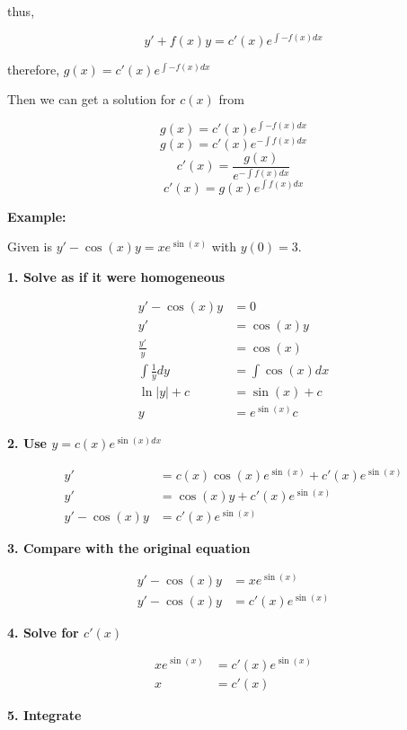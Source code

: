 thus,

\[
    y' + f(x)y = c'(x)e^{\int -f(x) dx}
\]

therefore, \(g(x) = c'(x)e^{\int -f(x) dx}\)

Then we can get a solution for \(c(x)\) from

\[
    g(x) = c'(x)e^{\int -f(x) dx}
\]
\[
    g(x) = c'(x)e^{-\int f(x) dx}
\]
\[
    c'(x) = \frac{g(x)}{e^{-\int f(x) dx}}
\]
\[
    c'(x) = g(x)e^{\int f(x) dx}
\]

\textbf{Example: }

Given is \(y' -\cos(x)y = x e^{\sin(x)}\) with \(y(0) = 3\).

\textbf{1. Solve as if it were homogeneous}

\begin{align*}
    y' -\cos(x)y      & = 0              \\
    y'                & = \cos(x)y       \\
    \frac{y'}{y}      & = \cos(x)        \\
    \int\frac{1}{y}dy & = \int \cos(x)dx \\
    \ln |y| + c       & = \sin(x) + c    \\
    y                 & = e^{\sin(x)}c
\end{align*}

\textbf{2. Use \(y = c(x)e^{\sin(x)dx}\)}

\begin{align*}
    y'            & = c(x)\cos(x)e^{\sin(x)} + c'(x)e^{\sin(x)} \\
    y'            & = \cos(x)y + c'(x)e^{\sin(x)}               \\
    y' - \cos(x)y & = c'(x)e^{\sin(x)}
\end{align*}

\textbf{3. Compare with the original equation}

\begin{align*}
    y' -\cos(x)y  & = x e^{\sin(x)}    \\
    y' - \cos(x)y & = c'(x)e^{\sin(x)}
\end{align*}

\textbf{4. Solve for \(c'(x)\)}

\begin{align*}
    xe^{\sin(x)} & = c'(x)e^{\sin(x)} \\
    x            & = c'(x)
\end{align*}

\textbf{5. Integrate}

